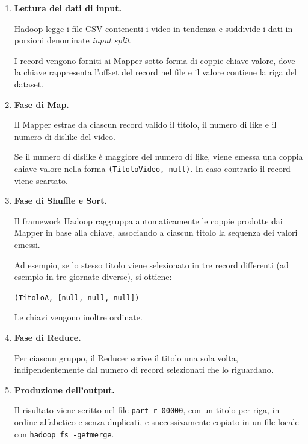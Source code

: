 \documentclass[12pt, a4paper]{article}
\begin{document}
\begin{enumerate}

    \item \textbf{Lettura dei dati di input.}

    Hadoop legge i file CSV contenenti i video
    in tendenza e suddivide i dati in porzioni
    denominate \textit{input split}.

    I record vengono forniti ai Mapper sotto forma
    di coppie chiave-valore, dove la chiave
    rappresenta l'offset del record nel file
    e il valore contiene la riga del dataset.

    \item \textbf{Fase di Map.}

    Il Mapper estrae da ciascun record valido
    il titolo, il numero di like e il numero
    di dislike del video.

    Se il numero di dislike è maggiore del numero
    di like, viene emessa una coppia chiave-valore
    nella forma \texttt{(TitoloVideo, null)}.
    In caso contrario il record viene scartato.

    \item \textbf{Fase di Shuffle e Sort.}

    Il framework Hadoop raggruppa automaticamente
    le coppie prodotte dai Mapper in base
    alla chiave, associando a ciascun titolo
    la sequenza dei valori emessi.

    Ad esempio, se lo stesso titolo viene
    selezionato in tre record differenti
    (ad esempio in tre giornate diverse), si ottiene:

    \begin{center}
        \texttt{(TitoloA, [null, null, null])}
    \end{center}

    Le chiavi vengono inoltre ordinate.

    \item \textbf{Fase di Reduce.}

    Per ciascun gruppo, il Reducer scrive
    il titolo una sola volta, indipendentemente
    dal numero di record selezionati
    che lo riguardano.

    \item \textbf{Produzione dell'output.}

    Il risultato viene scritto nel file
    \texttt{part-r-00000}, con un titolo per riga,
    in ordine alfabetico e senza duplicati,
    e successivamente copiato in un file locale
    con \texttt{hadoop fs -getmerge}.

\end{enumerate}
\end{document}
